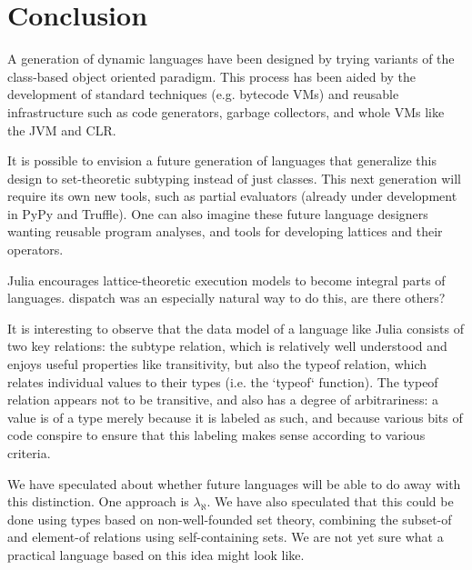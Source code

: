 \chapter{Conclusion}




A generation of dynamic languages have been designed by trying variants of
the class-based object oriented paradigm. This process has been aided by
the development of standard techniques (e.g. bytecode VMs) and reusable
infrastructure such as code generators, garbage collectors, and whole VMs
like the JVM and CLR.

It is possible to envision a future generation of languages that generalize
this design to set-theoretic subtyping instead of just classes. This next
generation will require its own new tools, such as partial evaluators (already
under development in PyPy and Truffle). One can also imagine these future
language designers wanting reusable program analyses, and tools for
developing lattices and their operators.

Julia encourages lattice-theoretic execution models to become integral
parts of languages. dispatch was an especially natural way to do this,
are there others?


It is interesting to observe that the data model of a language like Julia
consists of two key relations: the subtype relation, which is relatively
well understood and enjoys useful properties like transitivity, but also
the typeof relation, which relates individual values to their types
(i.e. the `typeof` function). The typeof relation appears not to be
transitive, and also has a degree of arbitrariness: a value is of a type
merely because it is labeled as such, and because various bits of code
conspire to ensure that this labeling makes sense according to various
criteria.

We have speculated about whether future languages will be able to do away
with this distinction. One approach is $\lambda_{\aleph}$. We have also
speculated that this could be done using types based on non-well-founded
set theory, combining the subset-of and element-of relations using
self-containing sets. We are not yet sure what a practical language based
on this idea might look like.


